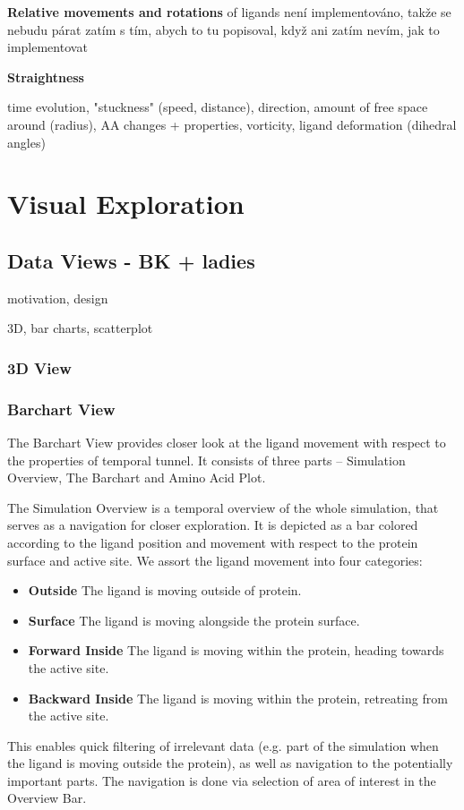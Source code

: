 \documentclass[twocolumn]{bmcart}%
\begin{document}
\begin{itemize}
{\color{red}\item \textbf{Relative movements and rotations} of ligands není implementováno, takže se nebudu párat zatím s tím, abych to tu popisoval, když ani zatím nevím, jak to implementovat} 

\item \textbf{Straightness} 

\end{itemize}


time evolution, "stuckness" (speed, distance), direction, amount of free space around (radius), AA changes + properties, vorticity, ligand deformation (dihedral angles)

\section*{Visual Exploration}
\subsection*{Data Views - BK + ladies}
motivation, design

3D, bar charts, scatterplot

\subsubsection*{3D View}

\subsubsection*{Barchart View}
The Barchart View provides closer look at the ligand movement with respect to the properties of temporal tunnel.
It consists of three parts -- Simulation Overview, The Barchart and Amino Acid Plot.

The Simulation Overview is a temporal overview of the whole simulation, that serves as a navigation for closer exploration.
It is depicted as a bar colored according to the ligand position and movement with respect to the protein surface and active site.
We assort the ligand movement into four categories: 
\begin{itemize}
\item \textbf{Outside} The ligand is moving outside of protein.
\item \textbf{Surface} The ligand is moving alongside the protein surface.
\item \textbf{Forward Inside} The ligand is moving within the protein, heading towards the active site.
\item \textbf{Backward Inside} The ligand is moving within the protein, retreating from the active site.
\end{itemize}
This enables quick filtering of irrelevant data (e.g. part of the simulation when the ligand is moving outside the protein), as well as navigation to the potentially important parts.
The navigation is done via selection of area of interest in the Overview Bar.
\end{document}

